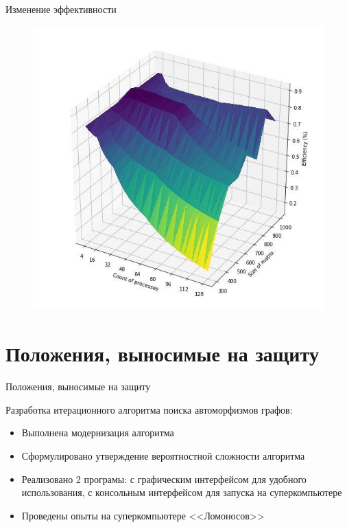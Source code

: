 \documentclass{beamer}
\begin{document}
\begin{frame}{Изменение эффективности}

\begin{figure}[ht]
\centering 
    \includegraphics[scale=0.4]{../image/ef.jpg}
\end{figure}

\end{frame}


\section{Положения, выносимые на защиту}
\begin{frame}{Положения, выносимые на защиту}

Разработка итерационного алгоритма поиска автоморфизмов графов:
\begin{itemize}
\item Выполнена модернизация алгоритма
\item Сформулировано утверждение вероятностной сложности алгоритма
\item Реализовано 2 програмы: с графическим интерфейсом для удобного использования, с консольным интерфейсом для запуска на суперкомпьютере\item Проведены опыты на суперкомпьютере <<Ломоносов>>
\end{itemize}

\end{frame}
\end{document}
